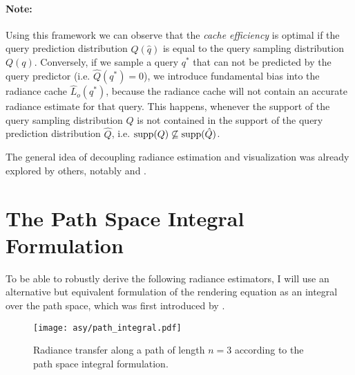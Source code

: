 \paragraph{Note:}
\label{par:cache_efficiency}
Using this framework we can observe that the \emph{cache efficiency} is optimal if the query prediction distribution $\hat{Q}(\hat{q})$ is equal to the query sampling distribution $Q(q)$.
Conversely, if we sample a query $q^*$ that can not be predicted by the query predictor (i.e. $\hat{Q}(q^*)=0$), we introduce fundamental bias into the radiance cache $\hat{L}_o(q^*)$, because the radiance cache will not contain an accurate radiance estimate for that query.
This happens, whenever the support of the query sampling distribution $Q$ is not contained in the support of the query prediction distribution $\hat{Q}$, i.e. $\operatorname{\mathrm{supp}}(Q) \not\subseteq \operatorname{\mathrm{supp}}(\hat{Q})$.

The general idea of decoupling radiance estimation and visualization was already explored by others, notably \textcite{walter1999} and \textcite{tole2002}.

\section{The Path Space Integral Formulation}
\label{sec:path_space_integral}
To be able to robustly derive the following radiance estimators, I will use an alternative but equivalent formulation of the rendering equation as an integral over the path space, which was first introduced by \textcite{veach1997}.
\begin{figure}[htb!]
    \centering
    \texttt{[image: asy/path\_integral.pdf]}
\caption{Radiance transfer along a path of length $n=3$ according to the path space integral formulation.}
\label{fig:path_space_integral}
\end{figure}

